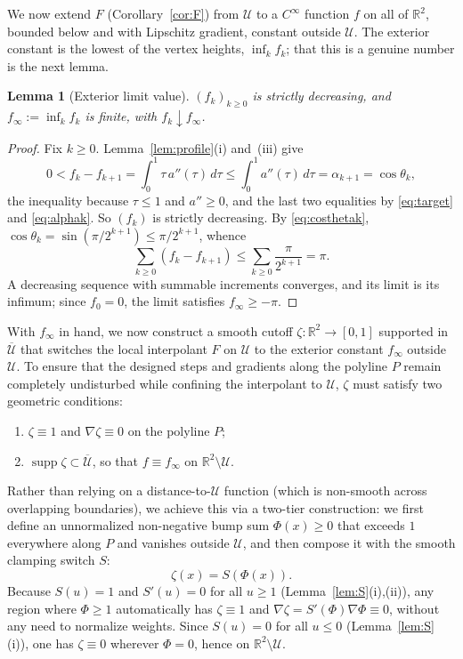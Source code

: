 \documentclass[11pt]{article}
\newtheorem{lemma}[theorem]{Lemma}
\newcommand{\R}{\mathbb{R}}
\begin{document}
We now extend $F$ (Corollary~\ref{cor:F}) from $\mathcal U$ to a $C^\infty$
function $f$ on all of $\R^2$, bounded below and with Lipschitz gradient,
constant outside $\mathcal U$. The exterior constant is the lowest of the
vertex heights, $\inf_kf_k$; that this is a genuine number is the next
lemma.

\begin{lemma}[Exterior limit value]
\label{lem:finf}
$(f_k)_{k\ge0}$ is strictly decreasing, and $f_\infty:=\inf_kf_k$ is
finite, with $f_k\downarrow f_\infty$.
\end{lemma}

\begin{proof}
Fix $k\ge0$. Lemma~\ref{lem:profile}(i) and~(iii) give
\[
0<f_k-f_{k+1}=\int_0^1\tau\,a''(\tau)\,d\tau\le\int_0^1a''(\tau)\,d\tau=\alpha_{k+1}=\cos\theta_k,
\]
the inequality because $\tau\le1$ and $a''\ge0$, and the last two equalities
by \eqref{eq:target} and \eqref{eq:alphak}. So $(f_k)$ is strictly
decreasing. By \eqref{eq:costhetak}, $\cos\theta_k=\sin(\pi/2^{k+1})\le\pi/2^{k+1}$,
whence
\[
\sum_{k\ge0}(f_k-f_{k+1})\le\sum_{k\ge0}\frac{\pi}{2^{k+1}}=\pi .
\]
A decreasing sequence with summable increments converges, and its limit is
its infimum; since $f_0=0$, the limit satisfies $f_\infty\ge-\pi$.
\end{proof}

With $f_\infty$ in hand, we now construct a smooth cutoff $\zeta: \R^2 \to [0, 1]$ supported in $\overline{\mathcal U}$ that switches the local interpolant $F$ on $\mathcal U$ to the exterior constant $f_\infty$ outside $\mathcal U$.
To ensure that the designed steps and gradients along the polyline $P$ remain completely undisturbed while confining the interpolant to $\mathcal U$, $\zeta$ must satisfy two geometric conditions:
\begin{enumerate}
\item $\zeta \equiv 1$ and $\nabla\zeta \equiv 0$ on the polyline $P$;
\item $\operatorname{supp}\zeta \subset \overline{\mathcal U}$, so that $f \equiv f_\infty$ on $\R^2 \setminus \mathcal U$.
\end{enumerate}

Rather than relying on a distance-to-$\mathcal U$ function (which is non-smooth across overlapping boundaries), we achieve this via a two-tier construction:
we first define an unnormalized non-negative bump sum $\Phi(x) \ge 0$ that exceeds $1$ everywhere along $P$ and vanishes outside $\mathcal U$, and then compose it with the smooth clamping switch $S$:
\begin{equation}
\label{eq:zetadef}
\zeta(x) = S(\Phi(x)).
\end{equation}
Because $S(u) = 1$ and $S'(u) = 0$ for all $u \ge 1$ (Lemma~\ref{lem:S}(i),(ii)), any region where $\Phi \ge 1$ automatically has $\zeta \equiv 1$ and $\nabla\zeta = S'(\Phi)\nabla\Phi \equiv 0$, without any need to normalize weights.
Since $S(u)=0$ for all $u\le 0$ (Lemma~\ref{lem:S}(i)), one has $\zeta\equiv 0$ wherever $\Phi=0$, hence on $\R^2\setminus\mathcal U$.
\end{document}
